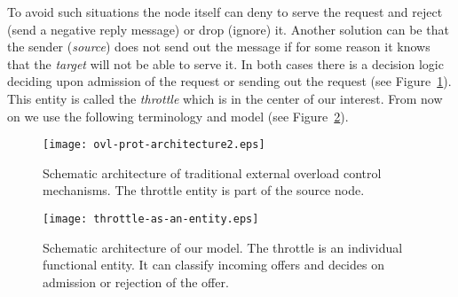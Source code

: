 \documentclass[conference]{IEEEtran}
\newcommand{\comment}[1]{}
\begin{document}
To avoid such situations the node itself can deny to serve the
request and reject (send a negative reply message) or drop (ignore)
it. Another solution can be that the sender (\textit{source}) does
not send out the message if for some reason it knows that the
\textit{target} will not be able to serve it. In both cases there is
a decision logic deciding upon admission of the request or sending
out the request (see Figure~\ref{fig:ovl-ctrl-architecture}). This
entity is called the \textit{throttle} which is in the center of our
interest. From now on we use the following terminology and model
(see Figure~\ref{fig:throttle-entity}).

\begin{figure}[h]
\begin{center}
\texttt{[image: ovl-prot-architecture2.eps]}
\end{center}
\caption{Schematic architecture of traditional external overload
control mechanisms. The throttle entity is part of the source
node.}\label{fig:ovl-ctrl-architecture}
\end{figure}

\comment{
\begin{figure}
\begin{center}

\end{center}
\caption{The throttle as an individual
entity.}\label{fig:throttle-entity}
\end{figure}
}

\begin{figure}[h]
\begin{center}
\texttt{[image: throttle-as-an-entity.eps]}
\end{center}
\caption{Schematic architecture of our model. The throttle is an
individual functional entity. It can classify incoming offers and
decides on admission or rejection of the
offer.}\label{fig:throttle-entity}
\end{figure}
\end{document}
